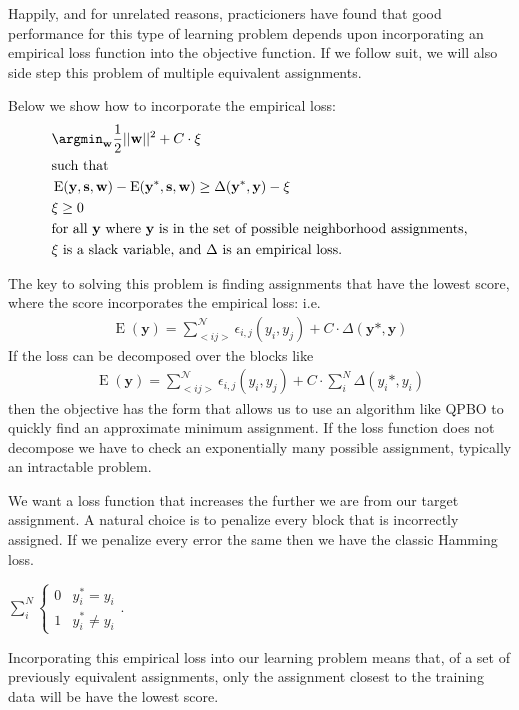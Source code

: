 Happily, and for unrelated reasons, practicioners have found that good
performance for this type of learning problem depends upon incorporating an
empirical loss function into the objective function. If we follow
suit, we will also side step this problem of multiple equivalent
assignments. 

Below we show how to incorporate the empirical loss:
%
\begin{align*}
&\argmin_{\mathbf{w}} \frac{1}{2}||\mathbf{w}||^2 +
  C\cdot\xi\\
&\text{such that} \\
&\operatorname{E}(\mathbf{y}, \mathbf{s}, \mathbf{w})
- \operatorname{E}(\mathbf{y}^*, \mathbf{s}, \mathbf{w}) \geq
\Delta(\mathbf{y}^*, \mathbf{y}) - \xi\\ 
& \xi \geq 0\\
&\text{for all } \mathbf{y} \text{ where } \mathbf{y} \text{ is in the set of
  possible neighborhood assignments,}\\
&\xi \text{ is a slack variable, and } \Delta \text{ is an empirical loss.}\\
\end{align*}
%

The key to solving this problem is finding assignments that have the
lowest score, where the score incorporates the empirical loss: i.e.
%
\begin{align}
\operatorname{E}(\mathbf{y}) = \sum_{<i j>}^{\mathcal{N}}\epsilon_{i,j}(y_i,y_j) + C\cdot\Delta(\mathbf{y}*,
\mathbf{y})
\end{align}
%
If the loss can be decomposed over the blocks like
%
\begin{align}
\operatorname{E}(\mathbf{y}) = \sum_{<i j>}^{\mathcal{N}}\epsilon_{i,j}(y_i,y_j) + C\cdot\sum_i^N\Delta(y_i*, y_i)
\end{align}
%
then the objective has the form that allows us to use an algorithm
like QPBO to quickly find an approximate minimum assignment. If the
loss function does not decompose we have to check an exponentially
many possible assignment, typically an intractable problem.

We want a loss function that increases the further we are from our
target assignment. A natural choice is to penalize every block that is
incorrectly assigned. If we penalize every error the same then we have
the classic Hamming loss. 

$\sum_i^N\begin{cases}
  0 &y_i^* = y_i \\
  1 &y_i^* \neq y_i
\end{cases}$. 

Incorporating this empirical loss into our learning problem means
that, of a set of previously equivalent assignments, only the
assignment closest to the training data will be have the lowest score.
